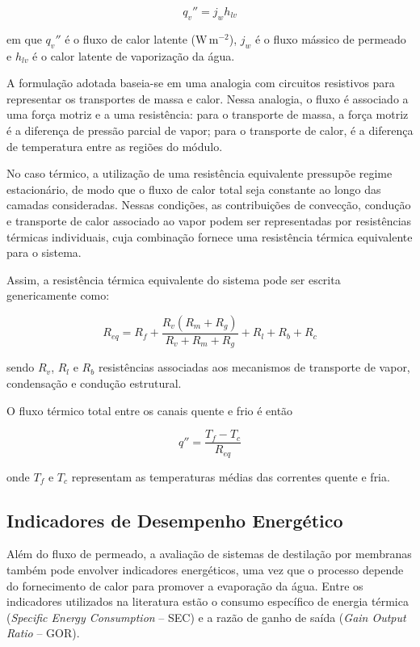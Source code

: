 \begin{equation}
q_v'' = j_w h_{lv}
\end{equation}

em que $q_v''$ é o fluxo de calor latente ($\mathrm{W\,m^{-2}}$), $j_w$ é o fluxo mássico de permeado e $h_{lv}$ é o calor latente de vaporização da água.

A formulação adotada baseia-se em uma analogia com circuitos resistivos para representar os transportes de massa e calor. Nessa analogia, o fluxo é associado a uma força motriz e a uma resistência: para o transporte de massa, a força motriz é a diferença de pressão parcial de vapor; para o transporte de calor, é a diferença de temperatura entre as regiões do módulo.

No caso térmico, a utilização de uma resistência equivalente pressupõe regime estacionário, de modo que o fluxo de calor total seja constante ao longo das camadas consideradas. Nessas condições, as contribuições de convecção, condução e transporte de calor associado ao vapor podem ser representadas por resistências térmicas individuais, cuja combinação fornece uma resistência térmica equivalente para o sistema.

Assim, a resistência térmica equivalente do sistema pode ser escrita genericamente como:


\begin{equation}
R_{eq}
=
R_f +
\frac{R_v (R_m + R_g)}{R_v + R_m + R_g}
+ R_l + R_b + R_c
\end{equation}

\noindent sendo $R_v$, $R_l$ e $R_b$ resistências associadas aos mecanismos de transporte de vapor, condensação e condução estrutural.

O fluxo térmico total entre os canais quente e frio é então

\begin{equation}
q'' = \frac{T_f - T_c}{R_{eq}}
\end{equation}

onde $T_f$ e $T_c$ representam as temperaturas médias das correntes quente e fria.



\subsection{Indicadores de Desempenho Energético}

Além do fluxo de permeado, a avaliação de sistemas de destilação por membranas também pode envolver indicadores energéticos, uma vez que o processo depende do fornecimento de calor para promover a evaporação da água. Entre os indicadores utilizados na literatura estão o consumo específico de energia térmica (\textit{Specific Energy Consumption} -- SEC) e a razão de ganho de saída (\textit{Gain Output Ratio} -- GOR).

